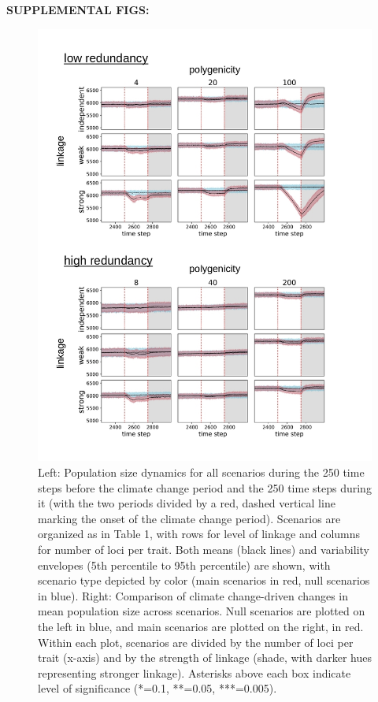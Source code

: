 \documentclass[9pt,twocolumn,twoside,lineno]{pnas-new}
\begin{document}

\textbf{SUPPLEMENTAL FIGS:}


\begin{figure}[\sidecaptionrelwidth][t]
\centering
\includegraphics[width=17.8cm]{pub/figs/FIG_S1_Nt_over_time.jpg}
\caption{Left: Population size dynamics for all scenarios during the 250 time steps before the climate change period and the 250 time steps during it (with the two periods divided by a red, dashed vertical line marking the onset of the climate change period). Scenarios are organized as in Table 1, with rows for level of linkage and columns for number of loci per trait. Both means (black lines) and variability envelopes (5th percentile to 95th percentile) are shown, with scenario type depicted by color (main scenarios in red, null scenarios in blue). Right: Comparison of climate change-driven changes in mean population size across scenarios. Null scenarios are plotted on the left in blue, and main scenarios are plotted on the right, in red. Within each plot, scenarios are divided by the number of loci per trait (x-axis) and by the strength of linkage (shade, with darker hues representing stronger linkage). Asterisks above each box indicate level of significance (*=0.1, **=0.05, ***=0.005).}
\label{fig:fig_s1}
\end{figure}
\end{document}

